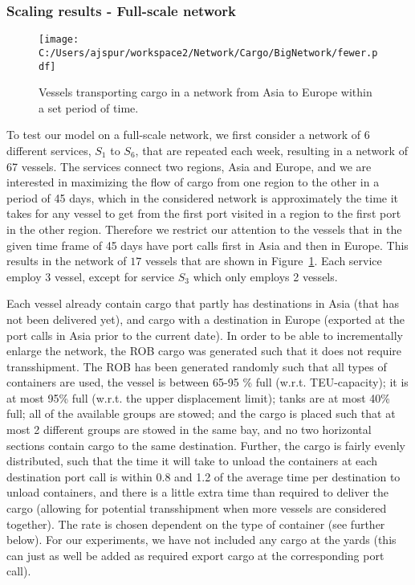 \subsubsection*{Scaling results - Full-scale network}
\begin{figure}
	\centering
		\texttt{[image: C:/Users/ajspur/workspace2/Network/Cargo/BigNetwork/fewer.pdf]}
	\caption{Vessels transporting cargo in a network from Asia to Europe within a set period of time.}
	\label{fig:full}
\end{figure}

\noindent To test our model on a full-scale network, we first consider a network of 6 different services, $S_1$ to $S_6$, that are repeated each week, resulting in a network of 67 vessels. The services connect two regions, Asia and Europe, and we are interested in maximizing the flow of cargo from one region to the other in a period of 45 days, which in the considered network is approximately the time it takes for any vessel to get from the first port visited in a region to the first port in the other region. Therefore we restrict our attention to the vessels that in the given time frame of 45 days have port calls first in Asia and then in Europe. This results in the network of $17$ vessels that are shown in Figure~\ref{fig:full}. Each service employ 3 vessel, except for service $S_3$ which only employs 2 vessels.

Each vessel already contain cargo that partly has destinations in Asia (that has not been delivered yet), and cargo with a destination in Europe (exported at the port calls in Asia prior to the current date). In order to be able to incrementally enlarge the network, the ROB cargo was generated such that it does not require transshipment. The ROB has been generated randomly such that all types of containers are used, the vessel is between 65-95 \% full (w.r.t. TEU-capacity); it is at most 95\% full (w.r.t. the upper displacement limit); tanks are at most 40\% full; all of the available groups are stowed; and the cargo is placed such that at most 2 different groups are stowed in the same bay, and no two horizontal sections contain cargo to the same destination. Further, the cargo is fairly evenly distributed, such that the time it will take to unload the containers at each destination port call is within 0.8 and 1.2 of the average time per destination to unload containers, and there is a little extra time than required to deliver the cargo (allowing for potential transshipment when more vessels are considered together). The rate is chosen dependent on the type of container (see further below).
For our experiments, we have not included any cargo at the yards (this can just as well be added as required export cargo at the corresponding port call).

